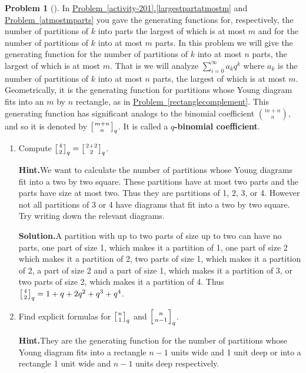\documentclass[10pt,]{book}
\newcommand{\terminology}[1]{\textbf{#1}}
\theoremstyle{plain}
\theoremstyle{definition}
\newtheorem{activity}[project]{Problem}
\theoremstyle{definition}
\numberwithin{equation}{chapter}
\newcommand{\qchoose}[2]{\left[{#1\atop#2}\right]_q}
\begin{document}
\begin{activity}[]\label{qtorialformula}
In \hyperref[largestpartatmostm]{Problem~\ref{activity-201}.\ref{largestpartatmostm}} and \hyperref[atmostmparts]{Problem~\ref{atmostmparts}} you gave the generating functions for, respectively, the number of partitions of \(k\) into parts the largest of which is at most \(m\) and for the number of partitions of \(k\) into at most \(m\) parts. In this problem we will give the generating function for the number of partitions of \(k\) into at most \(n\) parts, the largest of which is at most \(m\). That is we will analyze \(\sum_{i=0}^\infty a_kq^k\) where \(a_k\) is the number of partitions of \(k\) into at most \(n\) parts, the largest of which is at most \(m\). Geometrically, it is the generating function for partitions whose Young diagram fits into an \(m\) by \(n\) rectangle, as in \hyperref[rectanglecomplement]{Problem~\ref{rectanglecomplement}}. This generating function has significant analogs to the binomial coefficient \(\binom{m+n}{n}\), and so it is denoted by \(\qchoose{m+n}{n}\). It is called a \terminology{\(q\)-binomial coefficient}.%
\begin{enumerate}[font=\bfseries,label=(\alph*),ref=\alph*]
\item\label{task-142} Compute \(\qchoose{4}{2}=\qchoose{2+2}{2}\).%
\par\medskip\noindent%
\textbf{Hint.}\quad We want to calculate the number of partitions whose Young diagrams fit into a two by two square. These partitions have at most two parts and the parts have size at most two. Thus they are partitions of 1, 2, 3, or 4. However not all partitions of 3 or 4 have diagrams that fit into a two by two square. Try writing down the relevant diagrams.%
\par\medskip\noindent%
\textbf{Solution.}\quad A partition with up to two parts of size up to two can have no parts, one part of size 1, which makes it a partition of 1, one part of size 2 which makes it a partition of 2, two parts of size 1, which makes it a partition of 2, a part of size 2 and a part of size 1, which makes it a partition of 3, or two parts of size 2, which makes it a partition of 4. Thus \(\qchoose{4}{2}=1+q+2q^2+q^3+q^4\).%
\item\label{task-143} Find explicit formulas for \(\qchoose{n}{1}\) and \(\qchoose{n}{n-1}\).%
\par\medskip\noindent%
\textbf{Hint.}\quad They are the generating function for the number of partitions whose Young diagram fits into a rectangle \(n - 1\) units wide and 1 unit deep or into a rectangle 1 unit wide and \(n - 1\) units deep respectively.%

\end{enumerate}
\end{activity}
\end{document}
